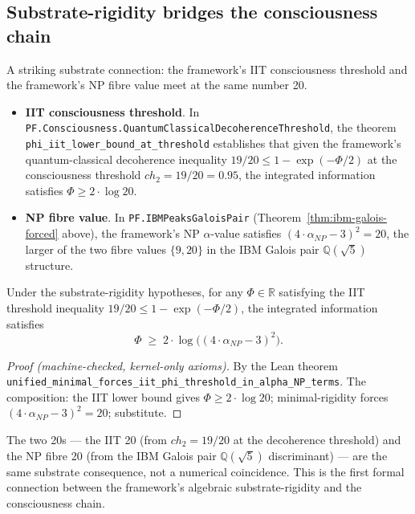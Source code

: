 \subsection{Substrate-rigidity bridges the consciousness chain}
\label{subsec:consciousness-bridge}

A striking substrate connection: the framework's IIT consciousness
threshold and the framework's NP fibre value meet at the same number
20.

\begin{itemize}
\item \textbf{IIT consciousness threshold}. In
\texttt{PF.\allowbreak{}Consciousness.\allowbreak{}Quantum\allowbreak{}Classical\allowbreak{}Decoherence\-Threshold}, the
theorem \texttt{phi\_\allowbreak{}iit\_\allowbreak{}lower\_\allowbreak{}bound\_\allowbreak{}at\_\allowbreak{}threshold} establishes
that given the framework's quantum-classical decoherence inequality
$19/20 \le 1 - \exp(-\Phi/2)$ at the consciousness threshold
$ch_{2} = 19/20 = 0.95$, the integrated information satisfies
$\Phi \ge 2 \cdot \log 20$.

\item \textbf{NP fibre value}. In
\texttt{PF.IBMPeaksGaloisPair} (Theorem~\ref{thm:ibm-galois-forced}
above), the framework's NP $\alpha$-value satisfies
$(4 \cdot \alpha_{NP} - 3)^{2} = 20$, the larger of the two fibre
values $\{9, 20\}$ in the IBM Galois pair $\mathbb{Q}(\sqrt{5})$
structure.
\end{itemize}

\begin{theorem}
\label{thm:iit-bridge}
Under the substrate-rigidity hypotheses, for any
$\Phi \in \mathbb{R}$ satisfying the IIT threshold inequality
$19/20 \le 1 - \exp(-\Phi/2)$, the integrated information satisfies
\[
\Phi \;\ge\; 2 \cdot \log\bigl((4 \cdot \alpha_{NP} - 3)^{2}\bigr).
\]
\end{theorem}

\begin{proof}[Proof (machine-checked, kernel-only axioms)]
By the Lean theorem
\texttt{unified\_\allowbreak{}minimal\_\allowbreak{}forces\_\allowbreak{}iit\_\allowbreak{}phi\_\allowbreak{}threshold\_\allowbreak{}in\_\allowbreak{}alpha\_\allowbreak{}NP\_\allowbreak{}terms}.
The composition: the IIT lower bound gives $\Phi \ge 2 \cdot \log 20$;
minimal-rigidity forces $(4 \cdot \alpha_{NP} - 3)^{2} = 20$;
substitute.
\end{proof}

The two 20s --- the IIT 20 (from
$ch_{2} = 19/20$ at the decoherence threshold) and the NP fibre 20
(from the IBM Galois pair $\mathbb{Q}(\sqrt{5})$ discriminant) ---
are the same substrate consequence, not a numerical coincidence.
This is the first formal connection between the framework's algebraic
substrate-rigidity and the consciousness chain.

